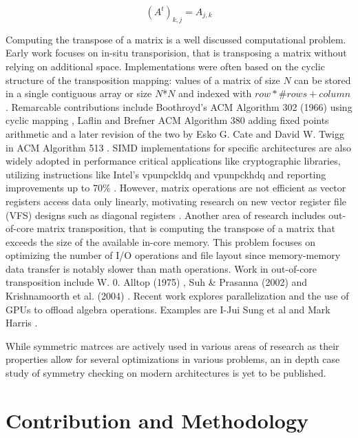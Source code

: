 \documentclass[conference]{IEEEtran}
\begin{document}
\begin{equation}
	(A^t)_{k,j} = A_{j,k}
\end{equation}

\fi

Computing the transpose of a matrix is a well discussed computational problem. Early
work focuses on in-situ transporision, that is transposing a matrix without
relying on additional space. Implementations were often based on the cyclic
structure of the transposition mapping: values of a matrix of size $N$ can be stored
in a single contiguous array or size $N$*$N$ and indexed with $row*\#rows+ column$.
Remarcable contributions include Boothroyd's ACM Algorithm 302 (1966) using cyclic mapping \cite{b13}, Laflin and Brefner ACM Algorithm 380
adding fixed points arithmetic \cite{b14} and
a later revision of the two by Esko G. Cate and David W. Twigg in ACM Algorithm 513 \cite{b15} .
SIMD implementations for specific architectures are also widely adopted
in performance critical applications like cryptographic libraries, utilizing instructions like Intel's vpunpckldq and vpunpckhdq \cite{b16} and reporting improvements up to 70\% \cite{b17}.
However, matrix operations are not efficient as vector registers access data only linearly, motivating research on new vector register file (VFS) designs such as diagonal registers \cite{b23}.
Another area of research includes out-of-core matrix transposition, that
is computing the transpose of a matrix that exceeds the size of the available in-core memory.
This problem focuses on optimizing the number of I/O operations and file layout since memory-memory data transfer is notably slower than math operations. Work in out-of-core transposition include W. 0. Alltop (1975) \cite{b18}, Suh \& Prasanna (2002) \cite{b19} and Krishnamoorth et al. (2004) \cite{b20}.
Recent work explores parallelization and the use of GPUs to offload algebra operations. Examples are I-Jui Sung et al \cite{b21} and Mark Harris \cite{b22}.

\iffalse
\textit{A square matrix $A$ is called symmetric if it equals its transpose} \cite{b12}.
\fi 
While symmetric matrces are actively used in various areas of research as their
properties allow for several optimizations in various problems, an in depth case study of symmetry
checking on modern architectures is yet to be published.

\section{Contribution and Methodology}
\end{document}
